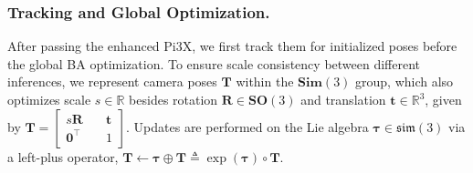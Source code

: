 \subsubsection{Tracking and Global Optimization.}After passing the enhanced Pi3X, we first track them for initialized poses before the global BA optimization. To ensure scale consistency between different inferences, we represent camera poses $\mathbf{T}$ within the $\mathbf{Sim}(3)$ group, which also optimizes scale $s \in \mathbb{R}$ besides rotation $\mathbf{R} \in \mathbf{SO}(3)$ and translation $\mathbf{t} \in \mathbb{R}^3$, given by
$
\mathbf{T} = 
\begin{bmatrix}
s \mathbf{R} \quad& \mathbf{t} \\
\mathbf{0}^\top \quad& 1
\end{bmatrix}.
$
Updates are performed on the Lie algebra $\boldsymbol{\tau} \in \mathfrak{sim}(3)$ via a left-plus operator,
$
\mathbf{T} \leftarrow \boldsymbol{\tau} \oplus \mathbf{T} \triangleq \exp(\boldsymbol{\tau}) \circ \mathbf{T}.
$

